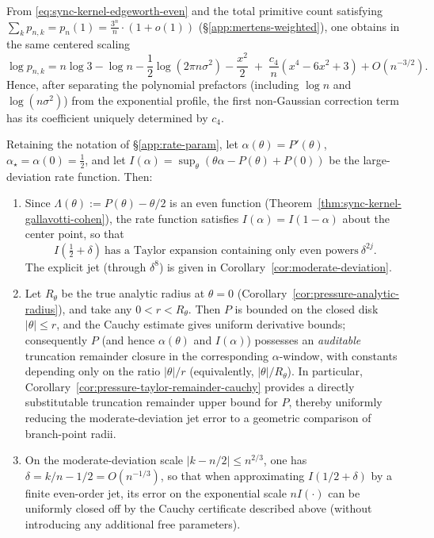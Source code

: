 \begin{remark}\label{rem:sync-kernel-edgeworth-log-form}
From \eqref{eq:sync-kernel-edgeworth-even} and the total primitive count satisfying
\(
\sum_k p_{n,k}=p_n(1)=\frac{3^n}{n}\cdot(1+o(1))
\)
(\S\ref{app:mertens-weighted}), one obtains in the same centered scaling
\[
\log p_{n,k}
=n\log 3-\log n-\frac12\log(2\pi n\sigma^2)-\frac{x^2}{2}
\;+\;\frac{c_4}{n}(x^4-6x^2+3)+O(n^{-3/2}).
\]
Hence, after separating the polynomial prefactors (including \(\log n\) and \(\log(n\sigma^2)\)) from the exponential profile, the first non-Gaussian correction term has its coefficient uniquely determined by \(c_4\).
\end{remark}

\begin{proposition}\label{prop:sync-kernel-moderate-deviation-cauchy-certified}
Retaining the notation of \S\ref{app:rate-param}, let \(\alpha(\theta)=P'(\theta)\), \(\alpha_\star=\alpha(0)=\tfrac12\), and let
\(
I(\alpha)=\sup_{\theta}(\theta\alpha-P(\theta)+P(0))
\)
be the large-deviation rate function.
Then:
\begin{enumerate}
  \item Since \(\Lambda(\theta):=P(\theta)-\theta/2\) is an even function (Theorem~\ref{thm:sync-kernel-gallavotti-cohen}),
  the rate function satisfies \(I(\alpha)=I(1-\alpha)\) about the center point, so that
  \[
  I\!\left(\tfrac12+\delta\right)\ \text{has a Taylor expansion containing only even powers}\ \delta^{2j}.
  \]
  The explicit jet (through \(\delta^8\)) is given in Corollary~\ref{cor:moderate-deviation}.
  \item Let \(R_\theta\) be the true analytic radius at \(\theta=0\) (Corollary~\ref{cor:pressure-analytic-radius}), and take any \(0<r<R_\theta\).
  Then \(P\) is bounded on the closed disk \(|\theta|\le r\), and the Cauchy estimate gives uniform derivative bounds; consequently \(P\) (and hence \(\alpha(\theta)\) and \(I(\alpha)\)) possesses an \emph{auditable} truncation remainder closure in the corresponding \(\alpha\)-window, with constants depending only on the ratio \(|\theta|/r\) (equivalently, \(|\theta|/R_\theta\)).
  In particular, Corollary~\ref{cor:pressure-taylor-remainder-cauchy} provides a directly substitutable truncation remainder upper bound for \(P\), thereby uniformly reducing the moderate-deviation jet error to a geometric comparison of branch-point radii.
  \item On the moderate-deviation scale \(|k-n/2|\le n^{2/3}\), one has \(\delta=k/n-1/2=O(n^{-1/3})\),
  so that when approximating \(I(1/2+\delta)\) by a finite even-order jet, its error on the exponential scale \(nI(\cdot)\) can be uniformly closed off by the Cauchy certificate described above (without introducing any additional free parameters).
\end{enumerate}
\end{proposition}

